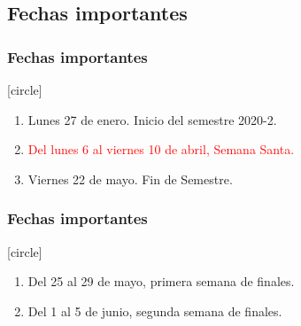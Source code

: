 \documentclass[12pt]{beamer}
\newcounter{saveenumi}
\newcommand{\seti}{\setcounter{saveenumi}{\value{enumi}}}
\newcommand{\conti}{\setcounter{enumi}{\value{saveenumi}}}
\begin{document}
\subsection{Fechas importantes}
\begin{frame}
\frametitle{Fechas importantes}
[circle]
\begin{enumerate}[<+->]
\item Lunes 27 de enero. Inicio del semestre 2020-2.
\item \textcolor{red}{Del lunes 6 al viernes 10 de abril, Semana Santa.}
\item Viernes 22 de mayo. Fin de Semestre.
\seti
\end{enumerate}
\end{frame}
\begin{frame}
\frametitle{Fechas importantes}
[circle]
\begin{enumerate}[<+->]
\conti
\item Del 25 al 29 de mayo, primera semana de finales.
\item Del 1 al 5 de junio, segunda semana de finales.
\end{enumerate}
\end{frame}
\end{document}
